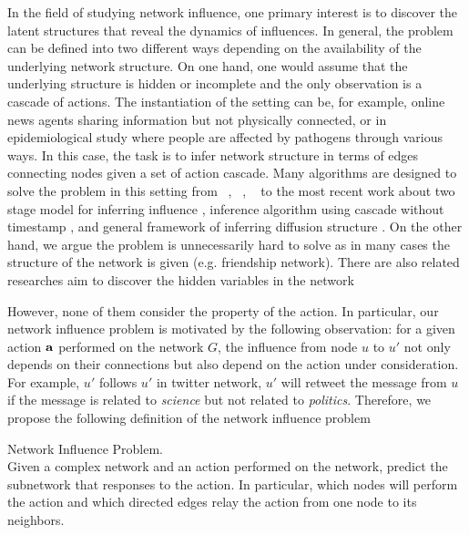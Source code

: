 {In the field of studying network influence, one primary interest is to discover the latent structures that reveal the dynamics of influences.
In general, the problem can be defined into two different ways depending on the availability of the underlying network structure.
On one hand, one would assume that the underlying structure is hidden or incomplete and the only observation is a cascade of actions.
The instantiation of the setting can be, for example, online news agents sharing information but not physically connected, or in epidemiological study where people are affected by pathogens through various ways.
In this case, the task is to infer network structure in terms of edges connecting nodes given a set of action cascade.
Many algorithms are designed to solve the problem in this setting from \netinf\ \citep{GomezRodriguez10inferring}, \netrate\ \citep{Rodrigues11unconvering}, \ \citep{Du12learning} to the most recent work about two stage model for inferring influence \citep{Du14influence}, inference algorithm using cascade without timestamp \citep{Amin14learning}, and general framework of inferring diffusion structure \citep{Daneshmand14estimating}.
On the other hand, we argue the problem is unnecessarily hard to solve as in many cases the structure of the network is given (e.g. friendship network).
There are also related researches aim to discover the hidden variables in the network \citep{Lovrek08prediction,Goyal10learning}

However, none of them consider the property of the action.
In particular, our network influence problem is motivated by the following observation: for a given action $\mathbf {a}$ performed on the network $G$, the influence from node $u$ to $u'$ not only depends on their connections but also depend on the action under consideration.
For example, $u'$ follows $u'$ in twitter network, $u'$ will retweet the message from $u$ if the message is related to \textit{science} but not related to \textit{politics}.
Therefore, we propose the following definition of the network influence problem
\begin{definition}{Network Influence Problem.}\\
	Given a complex network and an action performed on the network, predict the subnetwork that responses to the action. In particular, which nodes will perform the action and which directed edges relay the action from one node to its neighbors.
\end{definition}

}
